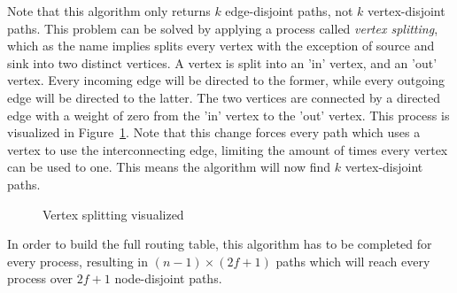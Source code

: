 Note that this algorithm only returns $k$ edge-disjoint paths, not $k$ vertex-disjoint paths. This problem can be solved by applying a process called \textit{vertex splitting}, which as the name implies splits every vertex with the exception of source and sink into two distinct vertices. 
A vertex is split into an 'in' vertex, and an 'out' vertex. Every incoming edge will be directed to the former, while every outgoing edge will be directed to the latter. The two vertices are connected by a directed edge with a weight of zero from the 'in' vertex to the 'out' vertex. This process is visualized in Figure~\ref{contr:node-splitting}. Note that this change forces every path which uses a vertex to use the interconnecting edge, limiting the amount of times every vertex can be used to one. This means the algorithm will now find $k$ vertex-disjoint paths.

\vspace{-0.12in}
\begin{figure}[h]
    \centering
    \caption{Vertex splitting visualized}
    \label{contr:node-splitting}
\end{figure}
\vspace{-0.12in}

In order to build the full routing table, this algorithm has to be completed for every process, resulting in $(n-1) \times (2f+1)$ paths which will reach every process over $2f+1$ node-disjoint paths.

